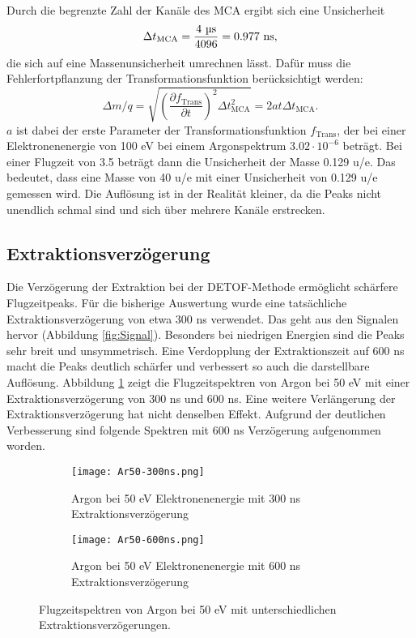 Durch die begrenzte Zahl der Kanäle des MCA ergibt sich eine Unsicherheit 
\begin{equation}
    \Delta t_{\mathrm{MCA}} = \frac{4 \text{ \textmu{s}}}{4096} = 0.977 \text{ ns},
\end{equation} 
die sich auf eine Massenunsicherheit umrechnen lässt. Dafür muss die Fehlerfortpflanzung der Transformationsfunktion berücksichtigt werden:
\begin{equation}
    \Delta m/q = \sqrt{\left(\frac{\partial f_\mathrm{Trans}}{\partial t}\right)^2 \Delta t_{\mathrm{MCA}}^2} = 2at\Delta t_{\mathrm{MCA}}.
\end{equation}
$a$ ist dabei der erste Parameter der Transformationsfunktion $f_\mathrm{Trans}$, der bei einer Elektronenenergie von 100 eV bei einem Argonspektrum $3.02 \cdot 10^{-6}$ beträgt. Bei einer Flugzeit von 3.5  beträgt dann die Unsicherheit der Masse 0.129 u/e. Das bedeutet, dass eine Masse von 40 u/e mit einer Unsicherheit von 0.129 u/e gemessen wird. Die Auflösung ist in der Realität kleiner, da die Peaks nicht unendlich schmal sind und sich über mehrere Kanäle erstrecken.

\subsection{Extraktionsverzögerung}
\label{sec:delay}
Die Verzögerung der Extraktion bei der DETOF-Methode ermöglicht schärfere Flugzeitpeaks. Für die bisherige Auswertung wurde eine tatsächliche Extraktionsverzögerung von etwa 300 ns verwendet. Das geht aus den Signalen hervor (Abbildung \ref{fig:Signal}). Besonders bei niedrigen Energien sind die Peaks sehr breit und unsymmetrisch. Eine Verdopplung der Extraktionszeit auf 600 ns macht die Peaks deutlich schärfer und verbessert so auch die darstellbare Auflösung. Abbildung \ref{fig:delay} zeigt die Flugzeitspektren von Argon bei 50 eV mit einer Extraktionsverzögerung von 300 ns und 600 ns. Eine weitere Verlängerung der Extraktionsverzögerung hat nicht denselben Effekt. Aufgrund der deutlichen Verbesserung sind folgende Spektren mit 600 ns Verzögerung aufgenommen worden.
\begin{figure}
    \centering
    \begin{subfigure}{.48\textwidth}
        \centering
        \texttt{[image: Ar50-300ns.png]}
        \caption{Argon bei 50 eV Elektronenenergie mit 300 ns Extraktionsverzögerung}
    \end{subfigure}%
    \hfill
    \begin{subfigure}{.48\textwidth}
        \centering
        \texttt{[image: Ar50-600ns.png]}
        \caption{Argon bei 50 eV Elektronenenergie mit 600 ns Extraktionsverzögerung}
        
    \end{subfigure}
    \caption[Einfluss der Extraktionsverzögerung auf Flugzeitspektren]{Flugzeitspektren von Argon bei 50 eV mit unterschiedlichen Extraktionsverzögerungen.}
    \label{fig:delay}
\end{figure}


